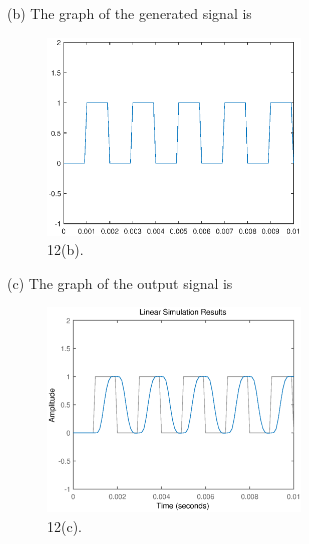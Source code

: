 \documentclass[a4paper]{article}
\begin{document}
(b) The graph of the generated signal is
\begin{figure}[H]
    \begin{center}
        \includegraphics[width=0.6\textwidth]{12(b).eps}
    \end{center}
    \caption{12(b).}
\end{figure}

(c) The graph of the output signal is
\begin{figure}[H]
    \begin{center}
        \includegraphics[width=0.6\textwidth]{12(c).eps}
    \end{center}
    \caption{12(c).}
\end{figure}
\end{document}
